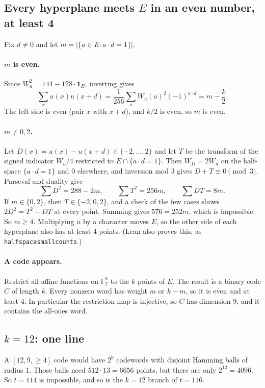 \documentclass[11pt]{article}
\theoremstyle{definition}
\theoremstyle{remark}
\newcommand{\F}{\mathbb{F}}
\newcommand{\ind}{\mathbf{1}}
\newcommand{\code}[1]{\texttt{#1}}
\DeclareRobustCommand{\_}{\textunderscore\allowbreak}
\begin{document}
\subsection{Every hyperplane meets \texorpdfstring{$E$}{E} in an even number, at least 4}
Fix $d\neq0$ and let $m=|\{a\in E:a\cdot d=1\}|$.

\paragraph{$m$ is even.} Since $W_u^2=144-128\cdot\ind_E$, inverting gives
\[
  \sum_x u(x)u(x+d)=\frac1{256}\sum_a W_u(a)^2(-1)^{a\cdot d}=m-\frac k2 .
\]
The left side is even (pair $x$ with $x+d$), and $k/2$ is even, so $m$ is even.

\paragraph{$m\ne0,2$.} Let $D(x)=u(x)-u(x+d)\in\{-2,\dots,2\}$ and let $T$ be the transform of the signed indicator $W_u/4$ restricted to $E\cap\{a\cdot d=1\}$. Then $W_D=2W_u$ on the half-space $\{a\cdot d=1\}$ and $0$ elsewhere, and inversion mod $3$ gives $D+T\equiv0\pmod3$. Parseval and duality give
\[
  \textstyle\sum D^2=288-2m,\qquad\sum T^2=256m,\qquad\sum DT=8m .
\]
If $m\in\{0,2\}$, then $T\in\{-2,0,2\}$, and a check of the few cases shows $2D^2=T^2-DT$ at every point. Summing gives $576=252m$, which is impossible. So $m\ge4$. Multiplying $u$ by a character moves $E$, so the other side of each hyperplane also has at least $4$ points. (Lean also proves this, as \code{halfspace\_small\_counts}.)

\paragraph{A code appears.} Restrict all affine functions on $\F_2^8$ to the $k$ points of $E$. The result is a binary code $C$ of length $k$. Every nonzero word has weight $m$ or $k-m$, so it is even and at least $4$. In particular the restriction map is injective, so $C$ has dimension $9$, and it contains the all-ones word.

\subsection{\texorpdfstring{$k=12$}{k=12}: one line}\label{sec:k12}
A $[12,9,\ge4]$ code would have $2^9$ codewords with disjoint Hamming balls of radius $1$. Those balls need $512\cdot13=6656$ points, but there are only $2^{12}=4096$. So $t=114$ is impossible, and so is the $k=12$ branch of $t=116$.
\end{document}
